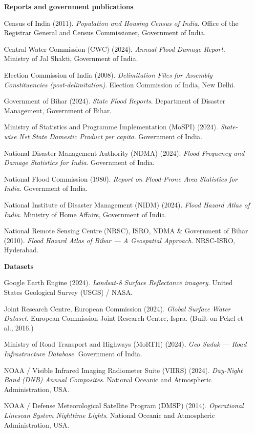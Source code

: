 \documentclass[12pt,a4paper,oneside]{report}
\begin{document}
\noindent\textbf{Reports and government publications}
\begin{description}[leftmargin=2.5em,style=nextline,itemsep=2pt]
\item[--] Census of India (2011). \textit{Population and Housing Census of India}. Office of the Registrar General and Census Commissioner, Government of India.
\item[--] Central Water Commission (CWC) (2024). \textit{Annual Flood Damage Report}. Ministry of Jal Shakti, Government of India.
\item[--] Election Commission of India (2008). \textit{Delimitation Files for Assembly Constituencies (post-delimitation)}. Election Commission of India, New Delhi.
\item[--] Government of Bihar (2024). \textit{State Flood Reports}. Department of Disaster Management, Government of Bihar.
\item[--] Ministry of Statistics and Programme Implementation (MoSPI) (2024). \textit{State-wise Net State Domestic Product per capita}. Government of India.
\item[--] National Disaster Management Authority (NDMA) (2024). \textit{Flood Frequency and Damage Statistics for India}. Government of India.
\item[--] National Flood Commission (1980). \textit{Report on Flood-Prone Area Statistics for India}. Government of India.
\item[--] National Institute of Disaster Management (NIDM) (2024). \textit{Flood Hazard Atlas of India}. Ministry of Home Affairs, Government of India.
\item[--] National Remote Sensing Centre (NRSC), ISRO, NDMA \& Government of Bihar (2010). \textit{Flood Hazard Atlas of Bihar --- A Geospatial Approach}. NRSC-ISRO, Hyderabad.
\end{description}

\noindent\textbf{Datasets}
\begin{description}[leftmargin=2.5em,style=nextline,itemsep=2pt]
\item[--] Google Earth Engine (2024). \textit{Landsat-8 Surface Reflectance imagery}. United States Geological Survey (USGS) / NASA.
\item[--] Joint Research Centre, European Commission (2024). \textit{Global Surface Water Dataset}. European Commission Joint Research Centre, Ispra. (Built on Pekel et al., 2016.)
\item[--] Ministry of Road Transport and Highways (MoRTH) (2024). \textit{Geo Sadak --- Road Infrastructure Database}. Government of India.
\item[--] NOAA / Visible Infrared Imaging Radiometer Suite (VIIRS) (2024). \textit{Day-Night Band (DNB) Annual Composites}. National Oceanic and Atmospheric Administration, USA.
\item[--] NOAA / Defense Meteorological Satellite Program (DMSP) (2014). \textit{Operational Linescan System Nighttime Lights}. National Oceanic and Atmospheric Administration, USA.
\end{description}
\end{document}
